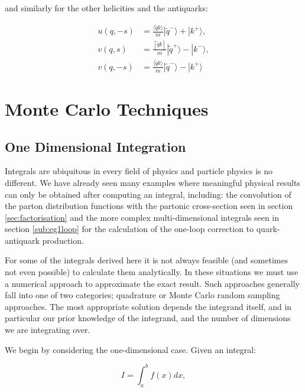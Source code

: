 		and similarly for the other helicities and the antiquarks:

		\begin{subequations}
		\begin{align}
			u(q, -s) &= \frac{\langle \widetilde{q}k\rangle}{m}|\widetilde{q}^-\rangle + |k^+\rangle, \\
			v(q,  s) &= \frac{[\widetilde{q}k]}{m}|\widetilde{q}^+\rangle - |k^-\rangle, \\
			v(q, -s) &= \frac{\langle \widetilde{q}k\rangle}{m}|\widetilde{q}^-\rangle - |k^+\rangle
		\end{align}
		\end{subequations}

\section{Monte Carlo Techniques}
	\label{sec:MC}

	\subsection{One Dimensional Integration}
	\label{sub:MCOneD}

	Integrals are ubiquitous in every field of physics and particle physics is no different.  We have already seen many examples where meaningful physical results
	can only be obtained after computing an integral, including: the convolution of the parton distribution functions with the partonic
	cross-section seen in section \ref{sec:factorisation} and the more complex multi-dimensional integrals seen in section \ref{sub:eg1loop} for the calculation
	of the one-loop correction to quark-antiquark production.

	For some of the integrals derived here it is not always feasible (and sometimes not even possible) to calculate them analytically.  In these situations
	we must use a numerical approach to approximate the exact result.  Such approaches generally fall into one of two categories; quadrature
	or Monte Carlo random sampling approaches.  The most appropriate solution depends the integrand itself, and in particular our prior knowledge of
	the integrand, and the number of dimensions we are integrating over.

	We begin by considering the one-dimensional case.  Given an integral:

	\begin{equation}
		I = \int_a^b f(x)dx,
		\label{eqn:1DIntegral}
	\end{equation}

